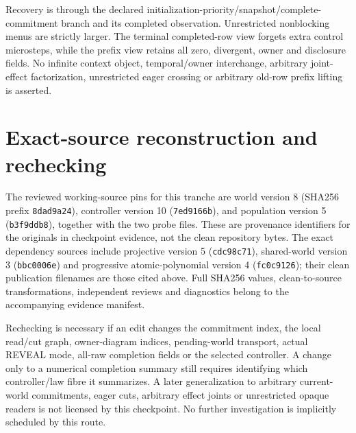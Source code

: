 \documentclass{article}
\begin{document}
Recovery is through the declared initialization-priority/snapshot/complete-commitment branch and its completed observation. Unrestricted nonblocking menus are strictly larger. The terminal completed-row view forgets extra control microsteps, while the prefix view retains all zero, divergent, owner and disclosure fields. No infinite context object, temporal/owner interchange, arbitrary joint-effect factorization, unrestricted eager crossing or arbitrary old-row prefix lifting is asserted.

\section{Exact-source reconstruction and rechecking}
The reviewed working-source pins for this tranche are world version 8 (SHA256 prefix \texttt{8dad9a24}), controller version 10 (\texttt{7ed9166b}), and population version 5 (\texttt{b3f9ddb8}), together with the two probe files. These are provenance identifiers for the originals in checkpoint evidence, not the clean repository bytes. The exact dependency sources include projective version 5 (\texttt{cdc98c71}), shared-world version 3 (\texttt{bbc0006e}) and progressive atomic-polynomial version 4 (\texttt{fc0c9126}); their clean publication filenames are those cited above. Full SHA256 values, clean-to-source transformations, independent reviews and diagnostics belong to the accompanying evidence manifest.

Rechecking is necessary if an edit changes the commitment index, the local read/cut graph, owner-diagram indices, pending-world transport, actual REVEAL mode, all-raw completion fields or the selected controller. A change only to a numerical completion summary still requires identifying which controller/law fibre it summarizes. A later generalization to arbitrary current-world commitments, eager cuts, arbitrary effect joints or unrestricted opaque readers is not licensed by this checkpoint. No further investigation is implicitly scheduled by this route.
\end{document}
